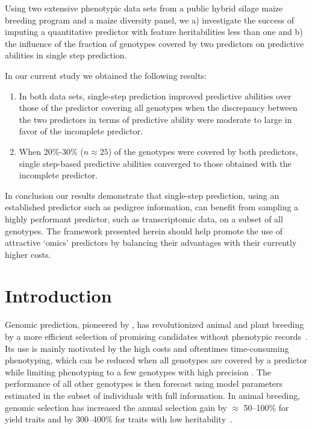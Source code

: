\documentclass[12pt,titlepage]{article}
\begin{document}
Using two extensive phenotypic data sets from a public hybrid silage maize
breeding program and a maize diversity panel, we a) investigate the success of
imputing a quantitative predictor with feature heritabilities less than one and
b) the influence of the fraction of genotypes covered by two predictors on
predictive abilities in single step prediction.

In our current study we obtained the following results:

\begin{enumerate}
\item In both data sets, single-step prediction improved predictive abilities
	over those of the predictor covering all genotypes when the discrepancy 
	between the	two predictors in terms of predictive ability were moderate to
	large in favor of the incomplete predictor.
\item When 20\%-30\% ($n \approx 25$) of the genotypes were covered by both
	predictors, single step-based predictive abilities converged to those
	obtained with the incomplete predictor.
\end{enumerate}

In conclusion our results demonstrate that single-step prediction, using
an established predictor such as pedigree information, can benefit from sampling
a highly performant predictor, such as transcriptomic data, on a subset of all
genotypes.
The framework presented herein should help promote the use of attractive
`omics' predictors by balancing their advantages with their currently higher
costs.



\section{Introduction}
Genomic prediction, pioneered by , has revolutionized
animal and plant breeding by a more efficient selection of promising candidates 
without phenotypic records~\cite{DeLosCampos2013,Garcia-Ruiz2016}.
Its use is mainly motivated by the high costs and oftentimes time-consuming
phenotyping, which can be reduced when all genotypes are covered by a predictor 
while limiting phenotyping to a few genotypes with high precision
\cite{Kadam2016}.
The performance of all other genotypes is then forecast using model parameters
estimated in the subset of individuals with full information.
In animal breeding, genomic selection has increased the annual selection gain 
by $\approx$ 50--100\% for yield traits and by 300--400\% for traits with low 
heritability~\cite{Garcia-Ruiz2016}.
\end{document}
